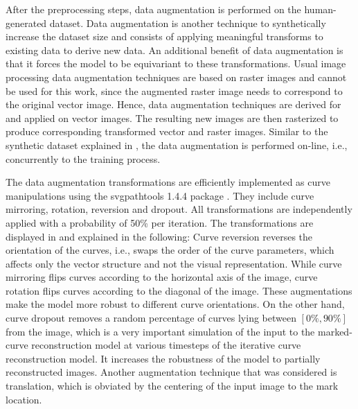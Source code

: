 After the preprocessing steps, data augmentation is performed on the human-generated dataset. Data augmentation is another technique to synthetically increase the dataset size and consists of applying meaningful transforms to existing data to derive new data. An additional benefit of data augmentation is that it forces the model to be equivariant to these transformations. Usual image processing data augmentation techniques are based on raster images and cannot be used for this work, since the augmented raster image needs to correspond to the original vector image. Hence, data augmentation techniques are derived for and applied on vector images. The resulting new images are then rasterized to produce corresponding transformed vector and raster images. Similar to the synthetic dataset explained in , the data augmentation is performed on-line, i.e., concurrently to the training process.

The data augmentation transformations are efficiently implemented as curve manipulations using the svgpathtools 1.4.4 package \citep{svgpathtools}. They include curve mirroring, rotation, reversion and dropout. All transformations are independently applied with a probability of 50\% per iteration. The transformations are displayed in  and explained in the following: Curve reversion reverses the orientation of the curves, i.e., swaps the order of the curve parameters, which affects only the vector structure and not the visual representation. While curve mirroring flips curves according to the horizontal axis of the image, curve rotation flips curves according to the diagonal of the image. These augmentations make the model more robust to different curve orientations. On the other hand, curve dropout removes a random percentage of curves lying between $[0\%,90\%]$ from the image, which is a very important simulation of the input to the marked-curve reconstruction model at various timesteps of the iterative curve reconstruction model. It increases the robustness of the model to partially reconstructed images. Another augmentation technique that was considered is translation, which is obviated by the centering of the input image to the mark location.


